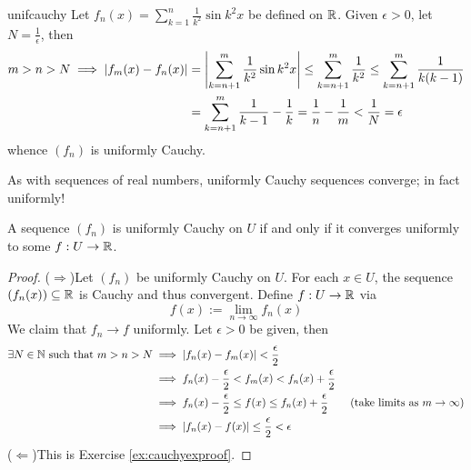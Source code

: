 \begin{example}{}{unifcauchy}
Let $f_n(x)=\sum\limits_{k=1}^n\frac 1{k^2}\sin k^2x$ be defined on $\mathbb{R}$. Given $\epsilon>0$, let $N=\frac 1\epsilon$, then\vspace{-10pt}
\begin{align*}
m>n>N\implies \left| f_m(x)-f_n(x)\right|&=\left| \sum_{k=n+1}^m\frac 1{k^2}\sin k^2x\right| \le\sum_{k=n+1}^m\frac 1{k^2} \le\sum_{k=n+1}^m\frac 1{k(k-1)}\\
&=\sum_{k=n+1}^m\frac 1{k-1}-\frac 1k =\frac 1n-\frac 1m<\frac 1N=\epsilon
\end{align*}
whence $(f_n)$ is uniformly Cauchy.
\end{example}\goodbreak

As with sequences of real numbers, uniformly Cauchy sequences converge; in fact uniformly!

\begin{thm}{}{}
A sequence $(f_n)$ is uniformly Cauchy on $U$ if and only if it converges uniformly to some $f:U\to\mathbb{R}$.
\end{thm}

\begin{proof}
($\Rightarrow$)\quad Let $(f_n)$ be uniformly Cauchy on $U$. For each $x\in U$, the sequence $(f_n(x))\subseteq\mathbb{R}$ is Cauchy and thus convergent. Define $f:U\to\mathbb{R}$ via
\[f(x):=\lim\limits_{n\to\infty}f_n(x)\]
We claim that $f_n\to f$ uniformly. Let $\epsilon>0$ be given, then 
\begin{align*}
\exists N\in\mathbb{N}\text{ such that }m>n>N&\implies \left| f_n(x)-f_m(x)\right|<\frac\epsilon 2\\
&\implies f_n(x)-\frac\epsilon 2<f_m(x)<f_n(x)+\frac\epsilon 2\\
&\implies f_n(x)-\frac\epsilon 2\le f(x)\le f_n(x)+\frac\epsilon 2 \tag{take limits as $m\to\infty$}\\
&\implies \left| f_n(x)-f(x)\right|\le\frac\epsilon 2<\epsilon
\end{align*}
($\Leftarrow$)\quad This is Exercise \ref{ex:cauchyexproof}.
\end{proof}


